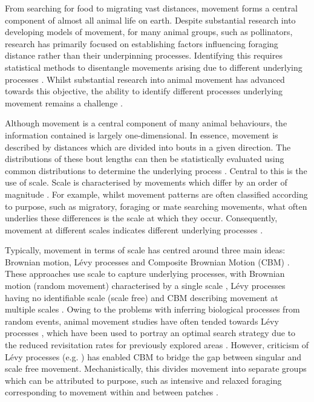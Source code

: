\documentclass[11pt,usenames,dvipsnames,a4paper]{article}
\begin{document}
\begin{linenumbers}
\hspace{\parindent}
From searching for food to migrating vast distances, movement forms a central component of almost all animal life on earth. Despite substantial research into developing models of movement, for many animal groups, such as pollinators, research has primarily focused on establishing factors influencing foraging distance \citep{Beekman2000, Hagler2011, Couvillon2015a} rather than their underpinning processes. Identifying this requires statistical methods to disentangle movements arising due to different underlying processes \citep{Nathan2008}. Whilst substantial research into animal movement has advanced towards this objective, the ability to identify different processes underlying movement remains a challenge \citep{Patterson2017}. 

Although movement is a central component of many animal behaviours, the information contained is largely one-dimensional. In essence, movement is described by distances which are divided into bouts in a given direction. The distributions of these bout lengths can then be statistically evaluated using common distributions to determine the underlying process \citep{Murphy2007, Reynolds2018}. Central to this is the use of scale. Scale is characterised by movements which differ by an order of magnitude \citep{Levin1992}. For example, whilst movement patterns are often classified according to purpose, such as migratory, foraging or mate searching movements, what often underlies these differences is the scale at which they occur. Consequently, movement at different scales indicates different underlying processes \citep{Nathan2008}. 

Typically, movement in terms of scale has centred around three main ideas: Brownian motion, L\'evy processes and Composite Brownian Motion (CBM) \citep{Nathan2008, Reynolds2018}. These approaches use scale to capture underlying processes, with Brownian motion (random movement) characterised by a single scale \citep{Barthelemy2008}, L\'evy processes having no identifiable scale (scale free) \citep{Viswanathan1999, Barthelemy2008, Reynolds2018} and CBM describing movement at multiple scales \citep{Petrovskii2011, Jansen2012}. Owing to the problems with inferring biological processes from random events, animal movement studies have often tended towards L\'evy processes \citep{Viswanathan1999, Ayala-Orozco2004, Boyer, Sims2008, Humphries2010, Harris2012, Baronchelli2013, Ariel2015}, which have been used to portray an optimal search strategy due to the reduced revisitation rates for previously explored areas \citep{Viswanathan1999, Humphries2014}. However, criticism of L\'evy processes (e.g. \cite{Pyke2015}) has enabled CBM to bridge the gap between singular and scale free movement. Mechanistically, this divides movement into separate groups which can be attributed to purpose, such as intensive and relaxed foraging corresponding to movement within and between patches \citep{Auger-Methe2015}. 


\end{linenumbers}
\end{document}
